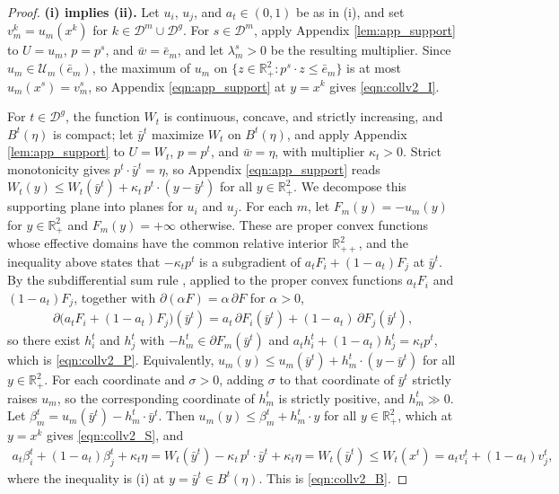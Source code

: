 \documentclass[11 pt]{article}
\begin{document}
\begin{proof}
\textbf{(i) implies (ii).} Let $u_{i}$, $u_{j}$, and $a_{t} \in (0,1)$ be as in (i), and set $v_{m}^{k} = u_{m}(x^{k})$ for $k \in \mathcal{D}^{m} \cup \mathcal{D}^{g}$. For $s \in \mathcal{D}^{m}$, apply Appendix \autoref{lem:app_support} to $U = u_{m}$, $p = p^{s}$, and $\bar w = \bar e_{m}$, and let $\lambda_{m}^{s} > 0$ be the resulting multiplier. Since $u_{m} \in \mathcal{U}_{m}(\bar e_{m})$, the maximum of $u_{m}$ on $\{ z \in \mathbb{R}^{2}_{+} : p^{s} \cdot z \leq \bar e_{m} \}$ is at most $u_{m}(x^{s}) = v_{m}^{s}$, so Appendix \autoref{eqn:app_support} at $y = x^{k}$ gives \eqref{eqn:collv2_I}.

For $t \in \mathcal{D}^{g}$, the function $W_{t}$ is continuous, concave, and strictly increasing, and $B^{t}(\eta)$ is compact; let $\bar y^{t}$ maximize $W_{t}$ on $B^{t}(\eta)$, and apply Appendix \autoref{lem:app_support} to $U = W_{t}$, $p = p^{t}$, and $\bar w = \eta$, with multiplier $\kappa_{t} > 0$. Strict monotonicity gives $p^{t} \cdot \bar y^{t} = \eta$, so Appendix \autoref{eqn:app_support} reads $W_{t}(y) \leq W_{t}(\bar y^{t}) + \kappa_{t}\, p^{t} \cdot (y - \bar y^{t})$ for all $y \in \mathbb{R}^{2}_{+}$. We decompose this supporting plane into planes for $u_{i}$ and $u_{j}$. For each $m$, let $F_{m}(y) = -u_{m}(y)$ for $y \in \mathbb{R}^{2}_{+}$ and $F_{m}(y) = +\infty$ otherwise. These are proper convex functions whose effective domains have the common relative interior $\mathbb{R}^{2}_{++}$, and the inequality above states that $-\kappa_{t} p^{t}$ is a subgradient of $a_{t} F_{i} + (1-a_{t}) F_{j}$ at $\bar y^{t}$. By the subdifferential sum rule \citep[Theorem~23.8]{rockafellar1970convex}, applied to the proper convex functions $a_{t} F_{i}$ and $(1-a_{t}) F_{j}$, together with $\partial(\alpha F) = \alpha\, \partial F$ for $\alpha > 0$,
\begin{align*}
\partial \bigl( a_{t} F_{i} + (1-a_{t}) F_{j} \bigr)(\bar y^{t}) = a_{t}\, \partial F_{i}(\bar y^{t}) + (1-a_{t})\, \partial F_{j}(\bar y^{t}),
\end{align*}
so there exist $h_{i}^{t}$ and $h_{j}^{t}$ with $-h_{m}^{t} \in \partial F_{m}(\bar y^{t})$ and $a_{t} h_{i}^{t} + (1-a_{t}) h_{j}^{t} = \kappa_{t} p^{t}$, which is \eqref{eqn:collv2_P}. Equivalently, $u_{m}(y) \leq u_{m}(\bar y^{t}) + h_{m}^{t} \cdot (y - \bar y^{t})$ for all $y \in \mathbb{R}^{2}_{+}$. For each coordinate and $\sigma > 0$, adding $\sigma$ to that coordinate of $\bar y^{t}$ strictly raises $u_{m}$, so the corresponding coordinate of $h_{m}^{t}$ is strictly positive, and $h_{m}^{t} \gg 0$. Let $\beta_{m}^{t} = u_{m}(\bar y^{t}) - h_{m}^{t} \cdot \bar y^{t}$. Then $u_{m}(y) \leq \beta_{m}^{t} + h_{m}^{t} \cdot y$ for all $y \in \mathbb{R}^{2}_{+}$, which at $y = x^{k}$ gives \eqref{eqn:collv2_S}, and
\begin{align*}
a_{t} \beta_{i}^{t} + (1-a_{t}) \beta_{j}^{t} + \kappa_{t} \eta = W_{t}(\bar y^{t}) - \kappa_{t}\, p^{t} \cdot \bar y^{t} + \kappa_{t} \eta = W_{t}(\bar y^{t}) \leq W_{t}(x^{t}) = a_{t} v_{i}^{t} + (1-a_{t}) v_{j}^{t},
\end{align*}
where the inequality is (i) at $y = \bar y^{t} \in B^{t}(\eta)$. This is \eqref{eqn:collv2_B}.


\end{proof}
\end{document}
